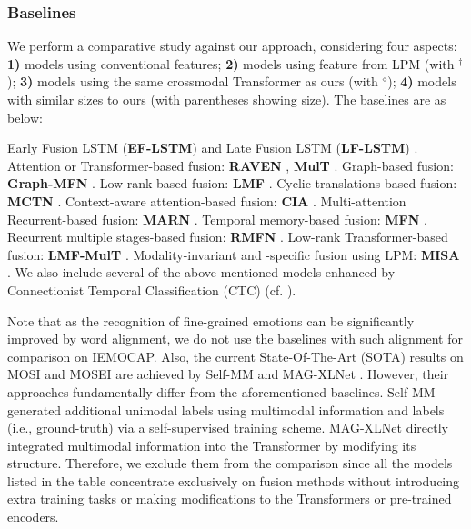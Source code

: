 \documentclass[11pt,a4paper]{article}
\begin{document}
\subsubsection{Baselines}
\label{sec:5.2.1}
We perform a comparative study against our approach, considering four aspects: \textbf{1)} models using conventional features; \textbf{2)} models using feature from LPM (with $^{\dag}$); \textbf{3)} models using the same crossmodal Transformer as ours (with $^{\diamond}$); \textbf{4)} models with similar sizes to ours (with parentheses showing size). The baselines are as below:

Early Fusion LSTM (\textbf{EF-LSTM}) and Late Fusion LSTM (\textbf{LF-LSTM}) \citep{Tsai2018Learning}. Attention or Transformer-based fusion: \textbf{RAVEN} \citep{Wang2019}, \textbf{MulT} \citep{Tsai2019}. Graph-based fusion: \textbf{Graph-MFN} \citep{Zadeh2018}. Low-rank-based fusion: \textbf{LMF} \citep{Liu2018}. Cyclic translations-based fusion: \textbf{MCTN} \citep{pham2019found}. Context-aware attention-based fusion: \textbf{CIA} \citep{chauhan2019context}. Multi-attention Recurrent-based fusion: \textbf{MARN} \citep{zadeh2018multi}. Temporal memory-based fusion: \textbf{MFN} \citep{zadeh2018memory}. Recurrent multiple stages-based fusion: \textbf{RMFN} \citep{liang2018multimodal}. Low-rank Transformer-based fusion: \textbf{LMF-MulT} \citep{sahay2020low}. Modality-invariant and -specific fusion using LPM: \textbf{MISA} \citep{hazarika2020misa}. We also include several of the above-mentioned models enhanced by Connectionist Temporal Classification (CTC) (cf. \citet{Tsai2019}). 

Note that as the recognition of fine-grained emotions can be significantly improved by word alignment, we do not use the baselines with such alignment for comparison on IEMOCAP. Also, the current State-Of-The-Art (SOTA) results on MOSI and MOSEI are achieved by Self-MM \citep{yu2021learning} and MAG-XLNet \citep{rahman2020integrating}. However, their approaches fundamentally differ from the aforementioned baselines. Self-MM generated additional unimodal labels using multimodal information and labels (i.e., ground-truth) via a self-supervised training scheme. MAG-XLNet directly integrated multimodal information into the Transformer by modifying its structure. Therefore, we exclude them from the comparison since all the models listed in the table concentrate exclusively on fusion methods without introducing extra training tasks or making modifications to the Transformers or pre-trained encoders.
\end{document}
